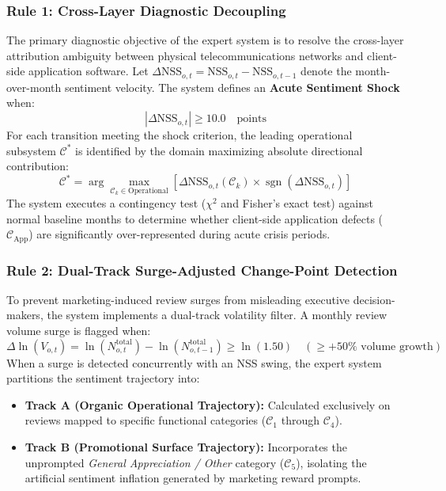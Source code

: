 \documentclass[review,12pt,authoryear]{elsarticle}
\begin{document}
\subsubsection{Rule 1: Cross-Layer Diagnostic Decoupling}
The primary diagnostic objective of the expert system is to resolve the cross-layer attribution ambiguity between physical telecommunications networks and client-side application software. Let $\Delta \text{NSS}_{o,t} = \text{NSS}_{o,t} - \text{NSS}_{o,t-1}$ denote the month-over-month sentiment velocity. The system defines an \textbf{Acute Sentiment Shock} when:
\begin{equation}
\label{eq:shock_threshold}
|\Delta \text{NSS}_{o,t}| \ge 10.0 \quad \text{points}
\end{equation}
For each transition meeting the shock criterion, the leading operational subsystem $\mathcal{C}^*$ is identified by the domain maximizing absolute directional contribution:
\begin{equation}
\mathcal{C}^* = \arg\max_{\mathcal{C}_k \in \text{Operational}} \left[ \Delta \text{NSS}_{o,t}(\mathcal{C}_k) \times \operatorname{sgn}(\Delta \text{NSS}_{o,t}) \right]
\end{equation}
The system executes a contingency test ($\chi^2$ and Fisher's exact test) against normal baseline months to determine whether client-side application defects ($\mathcal{C}_{\text{App}}$) are significantly over-represented during acute crisis periods.

\subsubsection{Rule 2: Dual-Track Surge-Adjusted Change-Point Detection}
To prevent marketing-induced review surges from misleading executive decision-makers, the system implements a dual-track volatility filter. A monthly review volume surge is flagged when:
\begin{equation}
\Delta \ln(V_{o,t}) = \ln(N_{o,t}^{\text{total}}) - \ln(N_{o,t-1}^{\text{total}}) \ge \ln(1.50) \quad (\ge +50\% \text{ volume growth})
\end{equation}
When a surge is detected concurrently with an NSS swing, the expert system partitions the sentiment trajectory into:
\begin{itemize}
    \item \textbf{Track A (Organic Operational Trajectory):} Calculated exclusively on reviews mapped to specific functional categories ($\mathcal{C}_1$ through $\mathcal{C}_4$).
    \item \textbf{Track B (Promotional Surface Trajectory):} Incorporates the unprompted \textit{General Appreciation / Other} category ($\mathcal{C}_5$), isolating the artificial sentiment inflation generated by marketing reward prompts.
\end{itemize}
\end{document}
